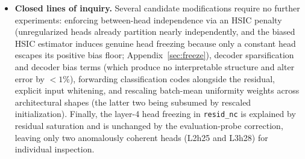 \begin{itemize}
rungs 2a+3) has now been trained for the modularity control above, as
\texttt{m5120\_g160top1\_p5} ($\fvu = 0.294$), though it has not yet
been added to the full evaluation ladder. Remaining baseline runs include
the single-layer variants at $m{=}11264$, a mid-range $\topk$ sweep
($k_{\mathrm{SAE}} \in \{512, 2048\}$), and random-support and
non-negative least-squares refit controls, the latter matching the
positivity-constrained refit of Gao et al.~\cite{gao2024}.
\item \textbf{Closed lines of inquiry.} Several candidate modifications
require no further experiments: enforcing between-head independence via an
HSIC penalty (unregularized heads already partition nearly independently,
and the biased HSIC estimator induces genuine head freezing because only
a constant head escapes its positive bias floor;
Appendix~\ref{sec:freeze}), decoder sparsification and decoder bias terms
(which produce no interpretable structure and alter error by $<1\%$),
forwarding classification codes alongside the residual, explicit input
whitening, and rescaling batch-mean uniformity weights across
architectural shapes (the latter two being subsumed by rescaled
initialization). Finally, the layer-4 head freezing in \texttt{resid\_nc}
is explained by residual saturation and is unchanged by the
evaluation-probe correction, leaving only two anomalously coherent heads
(L2h25 and L3h28) for individual inspection.
\end{itemize}

